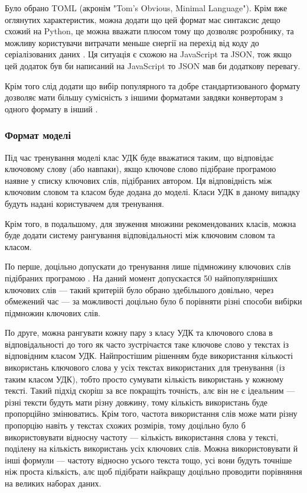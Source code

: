 \documentclass[14pt]{extarticle}
\begin{document}
  Було обрано TOML (акронім "Tom's Obvious, Minimal Language").
  Крім вже оглянутих характеристик,
  можна додати що цей формат має синтаксис дещо схожий на Python,
  це можна вважати плюсом тому що дозволяє розробнику,
  та можливу користувачи витрачати меньше єнергії
  на перехід від коду до серіалізованих даних \cite{Code_complete_5_2}.
  Ця ситуація є схожою на JavaScript та JSON,
  тож якщо цей додаток був би написаний на JavaScript
  то JSON мав би додаткову перевагу.

  Крім того слід додати що вибір популярного
  та добре стандартизованого формату дозволяє мати більшу сумісність
  з іншими форматами завдяки конверторам з одного формату в інший
  \cite{github_json2toml,github_xmltodict,github_x2js}.
  
  \subsubsection{Формат моделі}

  Під час тренування моделі клас УДК буде вважатися таким,
  що відповідає ключовому слову (або навпаки),
  якщо ключове слово підібране програмою наявне у списку ключових слів,
  підібраних автором.
  Ця відповідність між ключовим словом та класом буде додана до моделі.
  Класи УДК в даному випадку будуть надані користувачем для тренування.

  Крім того, в подальшому, для звуження множини рекомендованих класів,
  можна буде додати систему рангування відповідальності між ключовим словом
  та класом.

  По перше, доцільно допускати до тренування лише підмножину ключових слів
  підібраних програмою \cite{wiki_sampling}.
  На даний момент допускаєтся 50 найпопулярніших ключових слів ---
  такий критерій було обрано здебільшого довільно, через обмежений час ---
  за можливості доцільно було б порівняти різні способи вибірки
  \cite{wiki_sampling_methods}
  підмножин ключових слів.

  По друге, можна рангувати \cite{wiki_weight_function}
  кожну пару з класу УДК та ключового слова
  в відповідальності до того як часто зустрічаєтся таке ключове слово
  у текстах із відповідним класом УДК.
  Найпростішим рішенням буде використання кількості
  використань ключового слова у усіх текстах використаних для тренування
  (із таким класом УДК),
  тобто просто сумувати кількість використань у кожному тексті.
  Такий підхід скоріш за все покращіть точність, алє він не є ідеальним ---
  різні тексти будуть мати різну довжину,
  тому кількість використань буде пропорційно змінюватись.
  Крім того, частота використання слів може мати різну пропорцію навіть
  у текстах схожих розмірів, тому доцільно було б використовувати відносну
  частоту --- кількість використання слова у тексті,
  поділену на кількість використань усіх ключових слів.
  Можна використовувати й інші формули ---
  частоту відносно усього текста тощо,
  усі вони будуть точніше ніж проста кількість,
  алє щоб підібрати найкращу доцільно проводити порівняння
  на великих наборах даних.
\end{document}
